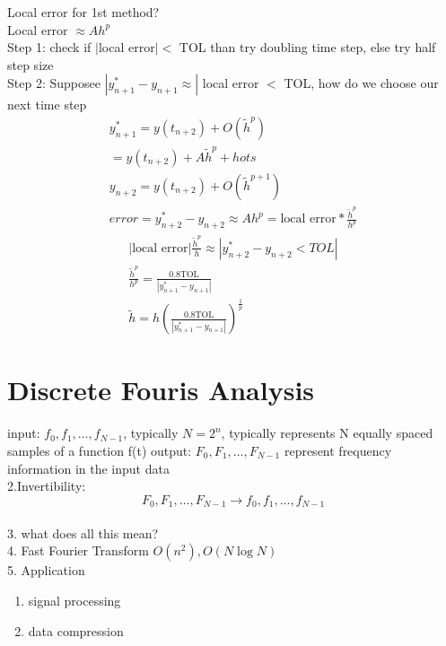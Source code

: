 \documentclass[10pt,usletter]{article}
\begin{document}
Local error for 1st method?\\
Local error $\approx Ah^p$\\
Step 1: check if $|$local error$| <$ TOL than try doubling time step, else try half step size\\
Step 2: Supposee $|y_{n+1}^*-y_{n+1}\approx|$ local error $<$ TOL, how do we choose our next time step\\
\begin{align*}
y_{n+1}^*=y(t_{n+2})+O(\tilde h^p)\\
=y(t_{n+2})+A\tilde h^p+hots\\
y_{n+2}=y(t_{n+2})+O(\tilde h^{p+1})\\
error = y_{n+2}^*-y_{n+2}\approx A h^p=\text{local error} * \frac{\tilde h^p}{h^p}
\end{align*} 
\begin{align*}
|\text{local error}|\frac{\tilde{h}^p}{h}\approx |y_{n+2}^*-y_{n+2}<TOL|\\
\frac{\tilde{h}^p}{h^p}=\frac{0.8\text{TOL}}{|y_{n+1}^*-y_{n+1}|}\\
\tilde{h}=h(\frac{0.8\text{TOL}}{|y_{n+1}^*-y_{n+1}|})^{\frac{1}{p}}
\end{align*}

\section{Discrete Fouris Analysis}
input: $f_0,f_1,\hdots, f_{N-1}$, typically $N=2^n$, typically represents N equally spaced samples of a function f(t)
output: $F_0,F_1,\hdots,F_{N-1}$ represent frequency information in the input data\\
2.Invertibility: $$F_0,F_1,\hdots,F_{N-1}\rightarrow f_0, f_1,\hdots,f_{N-1}$$\\
3. what does all this mean?\\
4. Fast Fourier Transform $O(n^2),O(N\log N)$\\
5. Application
\begin{enumerate}
\item signal processing
\item data compression
\end{enumerate}
\end{document}
